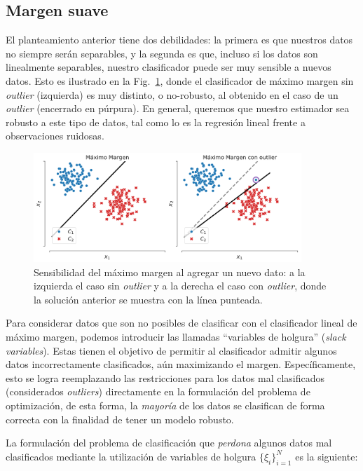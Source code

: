\subsection{Margen suave}

El planteamiento anterior tiene dos debilidades: la primera es que nuestros datos no siempre serán separables, y la segunda es que, incluso si los datos son linealmente separables, nuestro clasificador puede ser muy sensible a nuevos datos. Esto es ilustrado en la Fig.~\ref{fig:svm_softmargin}, donde el clasificador de máximo margen sin \emph{outlier} (izquierda) es muy distinto, o no-robusto, al obtenido en el caso de un \emph{outlier} (encerrado en púrpura). En general, queremos que nuestro estimador sea robusto a este tipo de datos, tal como lo es la regresión lineal frente a observaciones ruidosas. 

\begin{figure}[ht]
    \centering
    \includegraphics[width=0.9\textwidth]{img/cap5_margen_suave}
    \caption{Sensibilidad del máximo margen al agregar un nuevo dato: a la izquierda el caso sin \emph{outlier} y a la derecha el caso con \emph{outlier}, donde la solución anterior se muestra con la línea punteada.}
    \label{fig:svm_softmargin}
\end{figure}

Para considerar datos que son no posibles de clasificar con el clasificador lineal de máximo margen, podemos introducir las llamadas ``variables de holgura'' (\emph{slack variables}). Estas tienen el objetivo de permitir al clasificador admitir algunos datos incorrectamente clasificados, aún maximizando el margen. Específicamente, esto se logra reemplazando las restricciones para los datos mal clasificados (considerados \emph{outliers}) directamente en la formulación del problema de optimización, de esta forma, la \textit{mayoría} de los datos se clasifican de forma correcta con la finalidad de tener un modelo robusto.

\newpage

La formulación del problema de clasificación que \emph{perdona} algunos datos mal clasificados mediante la utilización de variables de holgura $\{\xi_i\}_{i=1}^N$ es la siguiente:

